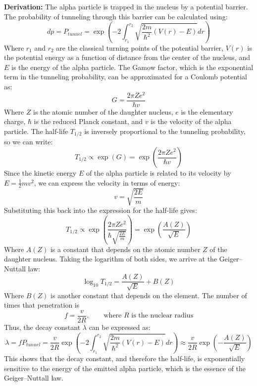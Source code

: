 \documentclass[11pt,a4paper]{article}
\begin{document}
\textbf{Derivation:}
The alpha particle is trapped in the nucleus by a potential barrier. The probability of tunneling through this barrier can be calculated using:
\begin{equation}
    dp=P_{tunnel}=\exp\left(-2\int_{r_1}^{r_2} \sqrt{\frac{2m}{\hbar^2}(V(r)-E)} dr\right)
\end{equation}
Where $r_1$ and $r_2$ are the classical turning points of the potential barrier, $V(r)$ is the potential energy as a function of distance from the center of the nucleus, and $E$ is the energy of the alpha particle.
The Gamow factor, which is the exponential term in the tunneling probability, can be approximated for a Coulomb potential as:
\begin{equation}
    G = \frac{2\pi Z e^2}{\hbar v}
\end{equation}
Where $Z$ is the atomic number of the daughter nucleus, $e$ is the elementary charge, $\hbar$ is the reduced Planck constant, and $v$ is the velocity of the alpha particle.
The half-life $T_{1/2}$ is inversely proportional to the tunneling probability, so we can write:
\begin{equation}
    T_{1/2} \propto \exp(G) = \exp\left(\frac{2\pi Z e^2}{\hbar v}\right)
\end{equation}
Since the kinetic energy $E$ of the alpha particle is related to its velocity by $E = \frac{1}{2}mv^2$, we can express the velocity in terms of energy:
\begin{equation}
    v = \sqrt{\frac{2E}{m}}
\end{equation}
Substituting this back into the expression for the half-life gives:
\begin{equation}
    T_{1/2} \propto \exp\left(\frac{2\pi Z e^2}{\hbar \sqrt{\frac{2E}{m}}}\right) = \exp\left(\frac{A(Z)}{\sqrt{E}}\right)
\end{equation}
Where $A(Z)$ is a constant that depends on the atomic number $Z$ of the daughter nucleus. Taking the logarithm of both sides, we arrive at the Geiger–Nuttall law:
\begin{equation}
    \log_{10} T_{1/2} = \frac{A(Z)}{\sqrt{E}} + B(Z)
\end{equation}
Where $B(Z)$ is another constant that depends on the element.
The number of times that penetration is
\begin{equation}
    f=\frac{v}{2R},\qquad\text{where }R\text{ is the nuclear radius}
\end{equation}
Thus, the decay constant $\lambda$ can be expressed as:
\begin{equation}
    \lambda = f P_{tunnel} = \frac{v}{2R} \exp\left(-2\int_{r_1}^{r_2} \sqrt{\frac{2m}{\hbar^2}(V(r)-E)} dr\right) \approx \frac{v}{2R} \exp\left(-\frac{A(Z)}{\sqrt{E}}\right)
\end{equation}
This shows that the decay constant, and therefore the half-life, is exponentially sensitive to the energy of the emitted alpha particle, which is the essence of the Geiger–Nuttall law.
\end{document}
